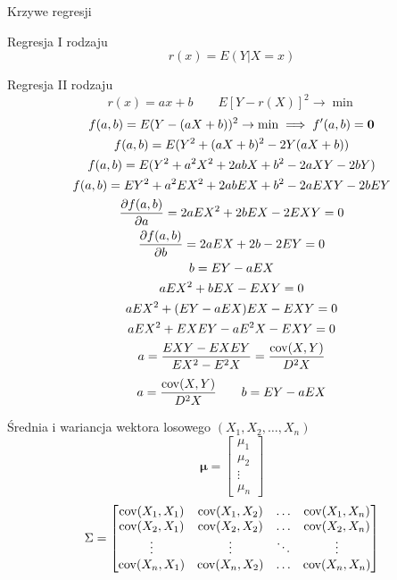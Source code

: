\documentclass{mp}
\begin{document}
\begin{frame}{Krzywe regresji}
\begin{block}{Regresja I rodzaju}
\[ r(x)=E(Y|X=x)  \]
\end{block}
\pause
\begin{block}{Regresja II rodzaju}
\[ r(x)=ax+b \qquad E\left[Y-r(X)\right]^2\to\min \]
\note
{
	\begin{gather*}
	f(a,b)=E(Y-(aX+b))^2\to\min \implies f'(a,b)=\bm{0} \\
	f(a,b)=E(Y^2+(aX+b)^2-2Y(aX+b))\\
	f(a,b)=E(Y^2+a^2X^2+2abX+b^2-2aXY-2bY)\\
	f(a,b)=EY^2+a^2EX^2+2abEX+b^2-2aEXY-2bEY \\
	\frac{\partial f(a,b)}{\partial a}=2aEX^2+2bEX-2EXY=0 \\
	\frac{\partial f(a,b)}{\partial b}=2aEX+2b-2EY=0 \\
	b=EY-aEX \\
	aEX^2+bEX-EXY=0 \\
	aEX^2+(EY-aEX)EX-EXY=0 \\
	aEX^2+EXEY-aE^2X-EXY=0 \\
	a=\frac{EXY-EXEY}{EX^2-E^2X}=\frac{\operatorname{cov}(X,Y)}{D^2X} \\
	\end{gather*}
}
\pause
\[ a=\frac{\operatorname{cov}(X,Y)}{D^2X} \qquad b=EY-aEX \]
\end{block}
\end{frame}
\begin{frame}{Średnia i wariancja wektora losowego $(X_1,X_2,\ldots,X_n)$}
\[ \bm{\mu}=\begin{bmatrix} \mu_1 \\ \mu_2 \\ \vdots \\ \mu_n \end{bmatrix} \]
\[ \Sigma=\begin{bmatrix}
\operatorname{cov}(X_1,X_1) & \operatorname{cov}(X_1,X_2) & \ldots & \operatorname{cov}(X_1,X_n) \\
\operatorname{cov}(X_2,X_1) & \operatorname{cov}(X_2,X_2) & \ldots & \operatorname{cov}(X_2,X_n) \\
\vdots & \vdots & \ddots & \vdots \\
\operatorname{cov}(X_n,X_1) & \operatorname{cov}(X_n,X_2) & \ldots & \operatorname{cov}(X_n,X_n) \\
\end{bmatrix} \]
\end{frame}


\end{document}
